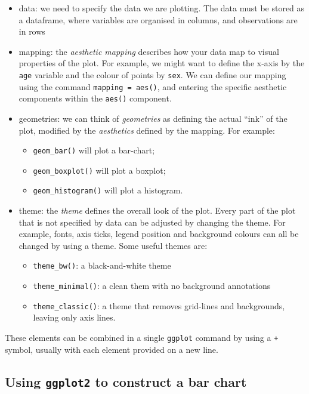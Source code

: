 \documentclass[
  a4paper,
]{memoir}
\providecommand{\tightlist}{%
  \setlength{\itemsep}{0pt}\setlength{\parskip}{0pt}}
\begin{document}
\begin{itemize}
\tightlist
\item
  data: we need to specify the data we are plotting. The data must be
  stored as a dataframe, where variables are organised in columns, and
  observations are in rows
\item
  mapping: the \emph{aesthetic mapping} describes how your data map to
  visual properties of the plot. For example, we might want to define
  the x-axis by the \texttt{age} variable and the colour of points by
  \texttt{sex}. We can define our mapping using the command
  \texttt{mapping\ =\ aes()}, and entering the specific aesthetic
  components within the \texttt{aes()} component.
\item
  geometries: we can think of \emph{geometries} as defining the actual
  ``ink'' of the plot, modified by the \emph{aesthetics} defined by the
  mapping. For example:

  \begin{itemize}
  \tightlist
  \item
    \texttt{geom\_bar()} will plot a bar-chart;
  \item
    \texttt{geom\_boxplot()} will plot a boxplot;
  \item
    \texttt{geom\_histogram()} will plot a histogram.
  \end{itemize}
\item
  theme: the \emph{theme} defines the overall look of the plot. Every
  part of the plot that is not specified by data can be adjusted by
  changing the theme. For example, fonts, axis ticks, legend position
  and background colours can all be changed by using a theme. Some
  useful themes are:

  \begin{itemize}
  \tightlist
  \item
    \texttt{theme\_bw()}: a black-and-white theme
  \item
    \texttt{theme\_minimal()}: a clean them with no background
    annotations
  \item
    \texttt{theme\_classic()}: a theme that removes grid-lines and
    backgrounds, leaving only axis lines.
  \end{itemize}
\end{itemize}

These elements can be combined in a single \texttt{ggplot} command by
using a \texttt{+} symbol, usually with each element provided on a new
line.

\subsection{\texorpdfstring{Using \texttt{ggplot2} to construct a bar
chart}{Using ggplot2 to construct a bar chart}}\label{using-ggplot2-to-construct-a-bar-chart}
\end{document}

